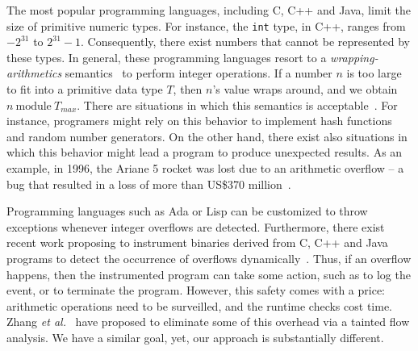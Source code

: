 \documentclass{sigplanconf}[10pt]
\begin{document}
The most popular programming languages, including C, C++ and Java, limit the
size of primitive numeric types.
For instance, the \texttt{int} type, in C++, ranges from $-2^{31}$ to
$2^{31}-1$.
Consequently, there exist numbers that cannot be represented by these types.
In general, these programming languages resort to a {\em wrapping-arithmetics}
semantics~\cite{Warren02} to perform integer operations.
If a number $n$ is too large to fit into a primitive data type $T$, then $n$'s
value wraps around, and we obtain $n \ \mbox{module} \ T_{max}$.
There are situations in which this semantics is acceptable~\cite{Dietz12}.
For instance, programers might rely on this behavior to implement hash functions
and random number generators.
On the other hand, there exist also situations in which this behavior might
lead a program to produce unexpected results.
As an example, in 1996, the Ariane 5 rocket was lost due to an arithmetic
overflow -- a bug that resulted in a loss of more than US\$370 million~\cite{Dowson97}.



Programming languages such as Ada or Lisp can be customized to throw exceptions
whenever integer overflows are detected.
Furthermore, there exist recent work proposing to instrument binaries derived
from C, C++ and Java programs to detect the occurrence of overflows
dynamically~\cite{Brumley07,Dietz12}.
Thus, if an overflow happens, then the instrumented program can take some
action, such as to log the event, or to terminate the program.
However, this safety comes with a price: arithmetic operations need to be
surveilled, and the runtime checks cost time.
Zhang {\em et al.}~\cite{Zhang10} have proposed to eliminate some of this
overhead via a tainted flow analysis.
We have a similar goal, yet, our approach is substantially different.
\end{document}
